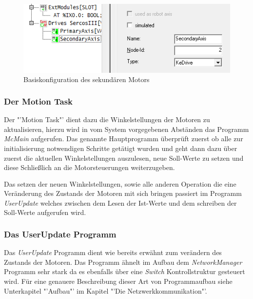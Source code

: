 \begin{figure}[H]
  \centering
  \begin{minipage}[t]{9 cm}
  	\centering
  	\includegraphics[width=9 cm]{images/DriveConfiguration} 
    \caption{Basiskonfiguration des sekundären Motors}
  \end{minipage}
\end{figure}

\subsubsection{Der Motion Task}
Der "'Motion Task"' dient dazu die Winkelstellungen der Motoren zu aktualisieren, hierzu wird in vom System vorgegebenen Abständen das Programm \textit{McMain} aufgerufen. Das genannte Hauptprogramm überprüft zuerst ob alle zur initialisierung notwendigen Schritte getätigt wurden und geht dann dazu über zuerst die aktuellen Winkelstellungen auszulesen, neue Soll-Werte zu setzen und diese Schließlich an die Motorsteuerungen weiterzugeben. 

Das setzen der neuen Winkelstellungen, sowie alle anderen Operation die eine Veränderung des Zustands der Motoren mit sich bringen passiert im Programm \textit{UserUpdate} welches zwischen dem Lesen der Ist-Werte und dem schreiben der Soll-Werte aufgerufen wird.

\subsubsection{Das UserUpdate Programm}
Das \textit{UserUpdate} Programm dient wie bereits erwähnt zum verändern des Zustands der Motoren. Das Programm ähnelt im Aufbau dem \textit{NetworkManager} Programm sehr stark da es ebenfalls über eine \textit{Switch} Kontrollstruktur gesteuert wird. Für eine genauere Beschreibung dieser Art von Programmaufbau siehe Unterkapitel "'Aufbau"' im Kapitel "'Die Netzwerkkommunikation"'.

